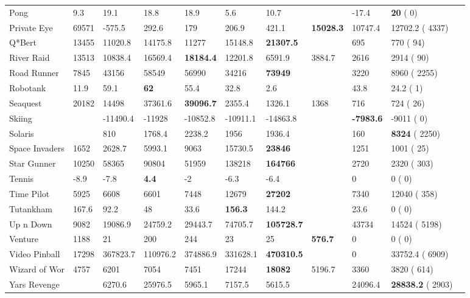 \documentclass[sigconf,screen]{acmart}\settopmatter{printfolios=true,printacmref=false}
\begin{document}
\begin{table*}[t]
{\begin{tabular}{l l l l l l l l l l l}
Pong & 9.3 & 19.1 & 18.8 & 18.9 & 5.6 & 10.7 &  & -17.4 & \textbf{20} {\tiny( 0)}\\
Private Eye & 69571 & -575.5 & 292.6 & 179 & 206.9 & 421.1 & \textbf{15028.3} & 10747.4 & 12702.2 {\tiny( 4337)}\\
Q*Bert & 13455 & 11020.8 & 14175.8 & 11277 & 15148.8 & \textbf{21307.5} &  & 695 & 770 {\tiny( 94)}\\
River Raid & 13513 & 10838.4 & 16569.4 & \textbf{18184.4} & 12201.8 & 6591.9 & 3884.7 & 2616 & 2914 {\tiny( 90)}\\
Road Runner & 7845 & 43156 & 58549 & 56990 & 34216 & \textbf{73949} &  & 3220 & 8960 {\tiny( 2255)}\\
Robotank & 11.9 & 59.1 & \textbf{62} & 55.4 & 32.8 & 2.6 &  & 43.8 & 24.2 {\tiny( 1)}\\
Seaquest & 20182 & 14498 & 37361.6 & \textbf{39096.7} & 2355.4 & 1326.1 & 1368 & 716 & 724 {\tiny( 26)}\\
Skiing &  & -11490.4 & -11928 & -10852.8 & -10911.1 & -14863.8 &  & \textbf{-7983.6} & -9011 {\tiny( 0)}\\
Solaris &  & 810 & 1768.4 & 2238.2 & 1956 & 1936.4 &  & 160 & \textbf{8324} {\tiny( 2250)}\\
Space Invaders & 1652 & 2628.7 & 5993.1 & 9063 & 15730.5 & \textbf{23846} &  & 1251 & 1001 {\tiny( 25)}\\
Star Gunner & 10250 & 58365 & 90804 & 51959 & 138218 & \textbf{164766} &  & 2720 & 2320 {\tiny( 303)}\\
Tennis & -8.9 & -7.8 & \textbf{4.4} & -2 & -6.3 & -6.4 &  & 0 & 0 {\tiny( 0)}\\
Time Pilot & 5925 & 6608 & 6601 & 7448 & 12679 & \textbf{27202} &  & 7340 & 12040 {\tiny( 358)}\\
Tutankham & 167.6 & 92.2 & 48 & 33.6 & \textbf{156.3} & 144.2 &  & 23.6 & 0 {\tiny( 0)}\\
Up n Down & 9082 & 19086.9 & 24759.2 & 29443.7 & 74705.7 & \textbf{105728.7} &  & 43734 & 14524 {\tiny( 5198)}\\
Venture & 1188 & 21 & 200 & 244 & 23 & 25 & \textbf{576.7} & 0 & 0 {\tiny( 0)}\\
Video Pinball & 17298 & 367823.7 & 110976.2 & 374886.9 & 331628.1 & \textbf{470310.5} &  & 0 & 33752.4 {\tiny( 6909)}\\
Wizard of Wor & 4757 & 6201 & 7054 & 7451 & 17244 & \textbf{18082} & 5196.7 & 3360 & 3820 {\tiny( 614)}\\
Yars Revenge &  & 6270.6 & 25976.5 & 5965.1 & 7157.5 & 5615.5 &  & 24096.4 & \textbf{28838.2} {\tiny( 2903)}\\

\end{tabular}}
\end{table*}
\end{document}
